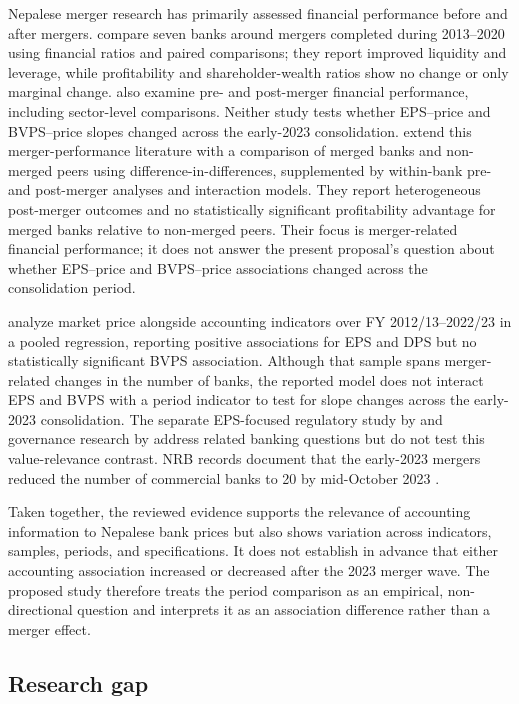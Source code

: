Nepalese merger research has primarily assessed financial performance before and after mergers. \citet{adhikari2023} compare seven banks around mergers completed during 2013--2020 using financial ratios and paired comparisons; they report improved liquidity and leverage, while profitability and shareholder-wealth ratios show no change or only marginal change. \citet{adhikari2023cbr} also examine pre- and post-merger financial performance, including sector-level comparisons. Neither study tests whether EPS--price and BVPS--price slopes changed across the early-2023 consolidation. \citet{acharya2026merger} extend this merger-performance literature with a comparison of merged banks and non-merged peers using difference-in-differences, supplemented by within-bank pre- and post-merger analyses and interaction models. They report heterogeneous post-merger outcomes and no statistically significant profitability advantage for merged banks relative to non-merged peers. Their focus is merger-related financial performance; it does not answer the present proposal's question about whether EPS--price and BVPS--price associations changed across the consolidation period.

\citet{bhattarai2024mps} analyze market price alongside accounting indicators over FY 2012/13--2022/23 in a pooled regression, reporting positive associations for EPS and DPS but no statistically significant BVPS association. Although that sample spans merger-related changes in the number of banks, the reported model does not interact EPS and BVPS with a period indicator to test for slope changes across the early-2023 consolidation. The separate EPS-focused regulatory study by \citet{bhattarai2024} and governance research by \citet{dongol2024} address related banking questions but do not test this value-relevance contrast. NRB records document that the early-2023 mergers reduced the number of commercial banks to 20 by mid-October 2023 \citep{nrb2023list}.

Taken together, the reviewed evidence supports the relevance of accounting information to Nepalese bank prices but also shows variation across indicators, samples, periods, and specifications. It does not establish in advance that either accounting association increased or decreased after the 2023 merger wave. The proposed study therefore treats the period comparison as an empirical, non-directional question and interprets it as an association difference rather than a merger effect.

\subsection{Research gap}

